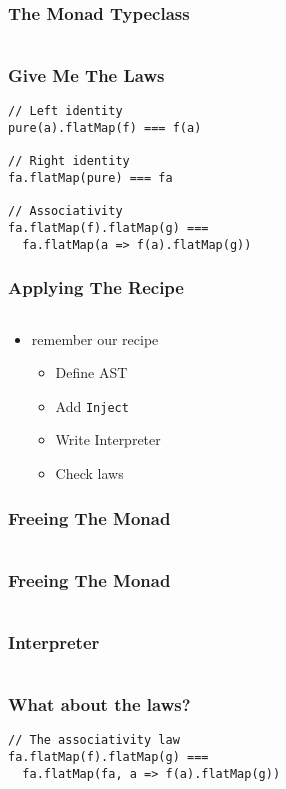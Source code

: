 \documentclass{beamer}
\newcommand{\recipe}{%
  \begin{itemize}
  \item Define AST
  \item Add \texttt{Inject}
  \item Write Interpreter
  \item Check laws
  \end{itemize}
}
\begin{document}
\begin{frame}[fragile]
  \frametitle{The Monad Typeclass}
  \begin{center}
    \inputminted{scala}{snippets/monad-typeclass.scala}
  \end{center}
\end{frame}

\begin{frame}[fragile]
  \frametitle{Give Me The Laws}
    \begin{center}
\begin{verbatim}
// Left identity
pure(a).flatMap(f) === f(a)

// Right identity
fa.flatMap(pure) === fa

// Associativity
fa.flatMap(f).flatMap(g) ===
  fa.flatMap(a => f(a).flatMap(g))
\end{verbatim}
    \end{center}
\end{frame}

\begin{frame}[fragile]
  \frametitle{Applying The Recipe}
  \begin{center}
    \inputminted{scala}{snippets/monad-typeclass.scala}
  \end{center}
  \begin{itemize}
  \item remember our recipe
    \recipe{}
  \end{itemize}
\end{frame}

\begin{frame}[fragile]
  \frametitle{Freeing The Monad}
  \begin{center}
    \inputminted{scala}{snippets/free-monad.scala}
  \end{center}
\end{frame}

\begin{frame}[fragile]
  \frametitle{Freeing The Monad}
  \begin{center}
    \inputminted{scala}{snippets/free-instance.scala}
  \end{center}
\end{frame}

\begin{frame}[fragile]
  \frametitle{Interpreter}
  \inputminted{scala}{snippets/free-interp.scala}
\end{frame}

\begin{frame}[fragile]
  \frametitle{What about the laws?}
  \begin{verbatim}
// The associativity law
fa.flatMap(f).flatMap(g) ===
  fa.flatMap(fa, a => f(a).flatMap(g))
  \end{verbatim}
  \vfill{}
  \inputminted[autogobble]{scala}{snippets/what-about-laws.scala}
\end{frame}
\end{document}
